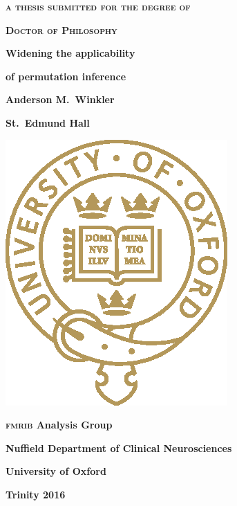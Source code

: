\pagestyle{empty}
\begin{center}
\textbf{\textsc{a thesis submitted for the degree of}}

\textbf{\textsc{Doctor of Philosophy}}

\vspace*{\fill}

\begin{Huge}
{\color{oxblue}\textbf{Widening the applicability}}
\end{Huge}

\vspace{2mm}

\begin{Huge}
{\color{oxblue}\textbf{of permutation inference}}
\end{Huge}

\vspace*{\fill}

\textbf{Anderson M.\ Winkler}

\textbf{St.\ Edmund Hall}

\vspace*{\fill}

\includegraphics[scale=1.6]{figures/ox_logo_special_gold_pos.eps}

\vspace*{\fill}

\textbf{\textsc{fmrib} Analysis Group}

\textbf{Nuffield Department of Clinical Neurosciences}

\textbf{University of Oxford}

\vspace*{\fill}

\textbf{Trinity 2016}
\end{center}


